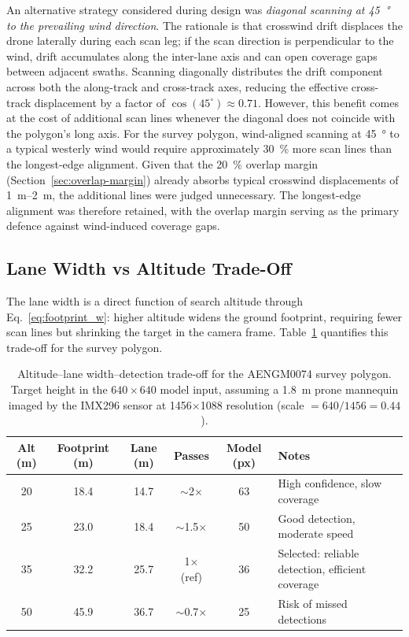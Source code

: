 An alternative strategy considered during design was \emph{diagonal scanning at \SI{45}{\degree} to the prevailing wind direction}.  The rationale is that crosswind drift displaces the drone laterally during each scan leg; if the scan direction is perpendicular to the wind, drift accumulates along the inter-lane axis and can open coverage gaps between adjacent swaths.  Scanning diagonally distributes the drift component across both the along-track and cross-track axes, reducing the effective cross-track displacement by a factor of $\cos(45^\circ) \approx 0.71$.  However, this benefit comes at the cost of additional scan lines whenever the diagonal does not coincide with the polygon's long axis.  For the survey polygon, wind-aligned scanning at \SI{45}{\degree} to a typical westerly wind would require approximately \SI{30}{\percent} more scan lines than the longest-edge alignment.  Given that the \SI{20}{\percent} overlap margin (Section~\ref{sec:overlap-margin}) already absorbs typical crosswind displacements of \SIrange{1}{2}{\metre}, the additional lines were judged unnecessary.  The longest-edge alignment was therefore retained, with the overlap margin serving as the primary defence against wind-induced coverage gaps.

\subsection{Lane Width vs Altitude Trade-Off}\label{sec:lane-alt}

The lane width is a direct function of search altitude through Eq.~\eqref{eq:footprint_w}: higher altitude widens the ground footprint, requiring fewer scan lines but shrinking the target in the camera frame.  Table~\ref{tab:alt-tradeoff} quantifies this trade-off for the survey polygon.

\begin{table}[ht]
  \centering\compactTable
  \caption{Altitude--lane width--detection trade-off for the AENGM0074 survey polygon.  Target height in the $640\!\times\!640$ model input, assuming a \SI{1.8}{\metre} prone mannequin imaged by the IMX296 sensor at 1456$\times$1088 resolution (scale $= 640/1456 = 0.44$).}\label{tab:alt-tradeoff}
  \begin{tabularx}{\linewidth}{@{}c c c c c X@{}}
    \toprule
    \textbf{Alt (m)} & \textbf{Footprint (m)} & \textbf{Lane (m)} & \textbf{Passes} & \textbf{Model (px)} & \textbf{Notes} \\
    \midrule
    20 & 18.4 & 14.7 & $\sim$2$\times$ & 63 & High confidence, slow coverage \\
    25 & 23.0 & 18.4 & $\sim$1.5$\times$ & 50 & Good detection, moderate speed \\
    35 & 32.2 & 25.7 & 1$\times$ (ref) & 36 & Selected: reliable detection, efficient coverage \\
    50 & 45.9 & 36.7 & $\sim$0.7$\times$ & 25 & Risk of missed detections \\
    \bottomrule
  \end{tabularx}
\end{table}

